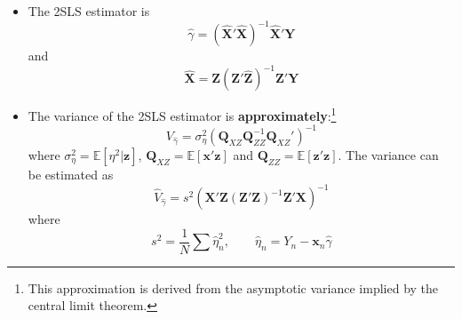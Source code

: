 \documentclass[12pt]{article}
\numberwithin{equation}{section}
\numberwithin{figure}{section}
\numberwithin{table}{section}
\begin{document}
  \begin{itemize}
    \item The 2SLS estimator is 
    \[ \hat{\gamma} = (\hat{\bm{X}}'\hat{\bm{X}})^{-1}\hat{\bm{X}}'\bm{Y}\] 
    and
    \[ \hat{\bm{X}} = \bm{Z}(\bm{Z}'\hat{\bm{Z}})^{-1}\bm{Z}'{\bm{Y}} \]
    \item The variance of the 2SLS estimator is \textbf{approximately}:\footnote{This approximation is derived from the asymptotic variance implied by the central limit theorem.} 
    \[ V_{\hat{\gamma}} = \sigma^2_{\eta}\left(\bm{Q}_{XZ}\bm{Q}_{ZZ}^{-1}\bm{Q}_{XZ}'\right)^{-1} \]
    where $\sigma^2_{\eta} = \mathbb{E}[\eta^2|\bm{z}]$, $\bm{Q}_{XZ}=\mathbb{E}[\bm{x}'\bm{z}]$ and $\bm{Q}_{ZZ} = \mathbb{E}[\bm{z}'\bm{z}]$.
    The variance can be estimated as
    \[ \hat{V}_{\hat{\gamma}} = s^2(\bm{X}'\bm{Z}(\bm{Z}'\bm{Z})^{-1}\bm{Z}'\bm{X})^{-1} \]
    where 
    \[ s^2 = \frac{1}{N}\sum \hat{\eta}_{n}^2,\qquad \hat{\eta}_{n} = Y_{n}-\bm{x}_{n}\hat{\gamma} \]
  \end{itemize}
\end{document}
